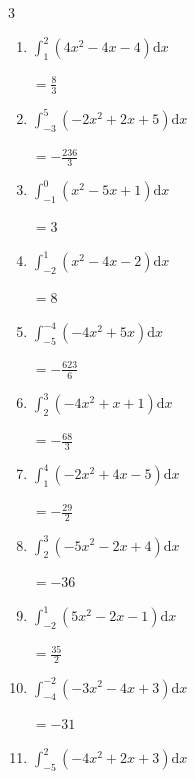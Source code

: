 \begin{multicols}{3}
\begin{enumerate}
        $\displaystyle =-\frac{11}{3}$

  \item $\displaystyle \int_{1}^{2}\left( 4x^{2}-4x-4 \right) \mathrm{d}x$

        $\displaystyle =\frac{8}{3}$

  \item $\displaystyle \int_{-3}^{5}\left( -2x^{2}+2x+5 \right) \mathrm{d}x$

        $\displaystyle =-\frac{236}{3}$

\columnbreak %

  \item $\displaystyle \int_{-1}^{0}\left( x^{2}-5x+1 \right) \mathrm{d}x$

        $\displaystyle =3$

  \item $\displaystyle \int_{-2}^{1}\left( x^{2}-4x-2 \right) \mathrm{d}x$

        $\displaystyle =8$

  \item $\displaystyle \int_{-5}^{-4}\left( -4x^{2}+5x \right) \mathrm{d}x$

        $\displaystyle =-\frac{623}{6}$

  \item $\displaystyle \int_{2}^{3}\left( -4x^{2}+x+1 \right) \mathrm{d}x$

        $\displaystyle =-\frac{68}{3}$

  \item $\displaystyle \int_{1}^{4}\left( -2x^{2}+4x-5 \right) \mathrm{d}x$

        $\displaystyle =-\frac{29}{2}$

\columnbreak %

  \item $\displaystyle \int_{2}^{3}\left( -5x^{2}-2x+4 \right) \mathrm{d}x$

        $\displaystyle =-36$

  \item $\displaystyle \int_{-2}^{1}\left( 5x^{2}-2x-1 \right) \mathrm{d}x$

        $\displaystyle =\frac{35}{2}$

  \item $\displaystyle \int_{-4}^{-2}\left( -3x^{2}-4x+3 \right) \mathrm{d}x$

        $\displaystyle =-31$

  \item $\displaystyle \int_{-5}^{2}\left( -4x^{2}+2x+3 \right) \mathrm{d}x$


\end{enumerate}
\end{multicols}
